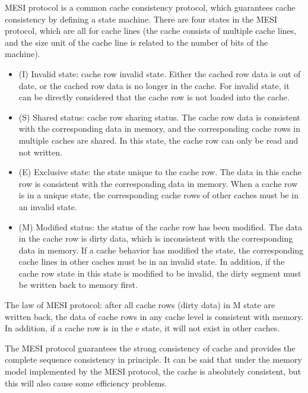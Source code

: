 MESI protocol is a common cache consistency protocol, which guarantees cache consistency by defining a state machine. There are four states in the MESI protocol, which are all for cache lines (the cache consists of multiple cache lines, and the size unit of the cache line is related to the number of bits of the machine).
\begin{itemize}
    \item (I) Invalid state: cache row invalid state. Either the cached row data is out of date, or the cached row data is no longer in the cache. For invalid state, it can be directly considered that the cache row is not loaded into the cache.
    \item (S) Shared status: cache row sharing status. The cache row data is consistent with the corresponding data in memory, and the corresponding cache rows in multiple caches are shared. In this state, the cache row can only be read and not written.
    \item (E) Exclusive state: the state unique to the cache row. The data in this cache row is consistent with the corresponding data in memory. When a cache row is in a unique state, the corresponding cache rows of other caches must be in an invalid state.
    \item (M) Modified status: the status of the cache row has been modified. The data in the cache row is dirty data, which is inconsistent with the corresponding data in memory. If a cache behavior has modified the state, the corresponding cache lines in other caches must be in an invalid state. In addition, if the cache row state in this state is modified to be invalid, the dirty segment must be written back to memory first.
\end{itemize}

The law of MESI protocol: after all cache rows (dirty data) in M state are written back, the data of cache rows in any cache level is consistent with memory. In addition, if a cache row is in the e state, it will not exist in other caches.

The MESI protocol guarantees the strong consistency of cache and provides the complete sequence consistency in principle. It can be said that under the memory model implemented by the MESI protocol, the cache is absolutely consistent, but this will also cause some efficiency problems. 
